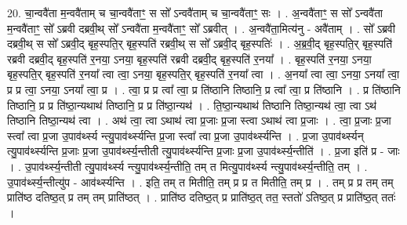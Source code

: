 \documentclass[17pt]{extarticle}
\begin{document}
20. चा॒न्ववै॑ता म॒न्ववै॑ताम् च चा॒न्ववै॑ताꣳ॒॒ स सो᳚ ऽन्ववै॑ताम् च चा॒न्ववै॑ताꣳ॒॒ सः । . अ॒न्ववै॑ताꣳ॒॒ स सो᳚ ऽन्ववै॑ता म॒न्ववै॑ताꣳ॒॒ सो᳚ ऽब्रवी दब्रवी॒थ् सो᳚ ऽन्ववै॑ता म॒न्ववै॑ताꣳ॒॒ सो᳚ ऽब्रवीत् । . अ॒न्ववै॑ता॒मित्य॑नु - अवै॑ताम् । . सो᳚ ऽब्रवी दब्रवी॒थ् स सो᳚ ऽब्रवी॒द् बृह॒स्पति॒र् बृह॒स्पति॑ रब्रवी॒थ् स सो᳚ ऽब्रवी॒द् बृह॒स्पतिः॑ । . अ॒ब्र॒वी॒द् बृह॒स्पति॒र् बृह॒स्पति॑ रब्रवी दब्रवी॒द् बृह॒स्पति॑ र॒नया॒ ऽनया॒ बृह॒स्पति॑ रब्रवी दब्रवी॒द् बृह॒स्पति॑ र॒नया᳚ । . बृह॒स्पति॑ र॒नया॒ ऽनया॒ बृह॒स्पति॒र् बृह॒स्पति॑ र॒नया᳚ त्वा त्वा॒ ऽनया॒ बृह॒स्पति॒र् बृह॒स्पति॑ र॒नया᳚ त्वा । . अ॒नया᳚ त्वा त्वा॒ ऽनया॒ ऽनया᳚ त्वा॒ प्र प्र त्वा॒ ऽनया॒ ऽनया᳚ त्वा॒ प्र । . त्वा॒ प्र प्र त्वा᳚ त्वा॒ प्र ति॑ष्ठानि तिष्ठानि॒ प्र त्वा᳚ त्वा॒ प्र ति॑ष्ठानि । . प्र ति॑ष्ठानि तिष्ठानि॒ प्र प्र ति॑ष्ठा॒न्यथाथ॑ तिष्ठानि॒ प्र प्र ति॑ष्ठा॒न्यथ॑ । . ति॒ष्ठा॒न्यथाथ॑ तिष्ठानि तिष्ठा॒न्यथ॑ त्वा॒ त्वा ऽथ॑ तिष्ठानि तिष्ठा॒न्यथ॑ त्वा । . अथ॑ त्वा॒ त्वा ऽथाथ॑ त्वा प्र॒जाः प्र॒जा स्त्वा ऽथाथ॑ त्वा प्र॒जाः । . त्वा॒ प्र॒जाः प्र॒जा स्त्वा᳚ त्वा प्र॒जा उ॒पाव॑र्थ्स्य न्त्यु॒पाव॑र्थ्स्यन्ति प्र॒जा स्त्वा᳚ त्वा प्र॒जा उ॒पाव॑र्थ्स्यन्ति । . प्र॒जा उ॒पाव॑र्थ्स्यन् त्यु॒पाव॑र्थ्स्यन्ति प्र॒जाः प्र॒जा उ॒पाव॑र्थ्स्य॒न्तीती त्यु॒पाव॑र्थ्स्यन्ति प्र॒जाः प्र॒जा उ॒पाव॑र्थ्स्य॒न्तीति॑ । . प्र॒जा इति॑ प्र - जाः । . उ॒पाव॑र्थ्स्य॒न्तीती त्यु॒पाव॑र्थ्स्य न्त्यु॒पाव॑र्थ्स्य॒न्तीति॒ तम् त मित्यु॒पाव॑र्थ्स्य न्त्यु॒पाव॑र्थ्स्य॒न्तीति॒ तम् । . उ॒पाव॑र्थ्स्य॒न्तीत्यु॑प - आव॑र्थ्स्यन्ति । . इति॒ तम् त मितीति॒ तम् प्र प्र त मितीति॒ तम् प्र । . तम् प्र प्र तम् तम् प्राति॑ष्ठ दतिष्ठ॒त् प्र तम् तम् प्राति॑ष्ठत् । . प्राति॑ष्ठ दतिष्ठ॒त् प्र प्राति॑ष्ठ॒त् तत॒ स्ततो॑ ऽतिष्ठ॒त् प्र प्राति॑ष्ठ॒त् ततः॑ । \newline
\end{document}

